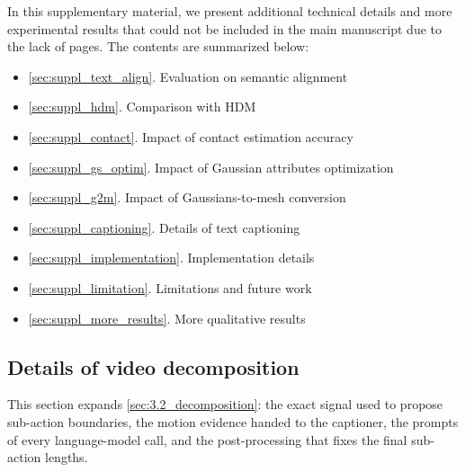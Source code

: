 \clearpage
\appendix

\setcounter{section}{0}
\setcounter{table}{0}
\setcounter{figure}{0}
\renewcommand{\thesection}{S\arabic{section}}   
\renewcommand{\thetable}{S\arabic{table}}   
\renewcommand{\thefigure}{S\arabic{figure}}

In this supplementary material, we present additional technical details and more experimental results that could not be included in the main manuscript due to the lack of pages.
The contents are summarized below:
\begin{itemize}
\vspace{2.5mm}
\item \ref{sec:suppl_text_align}. Evaluation on semantic alignment
\item \ref{sec:suppl_hdm}. Comparison with HDM
\item \ref{sec:suppl_contact}. Impact of contact estimation accuracy
\item \ref{sec:suppl_gs_optim}. Impact of Gaussian attributes optimization
\item \ref{sec:suppl_g2m}. Impact of Gaussians-to-mesh conversion
\item \ref{sec:suppl_captioning}. Details of text captioning
\item \ref{sec:suppl_implementation}. Implementation details
\item \ref{sec:suppl_limitation}. Limitations and future work
\item \ref{sec:suppl_more_results}. More qualitative results
\end{itemize}


\subsection{Details of video decomposition}
\label{sec:supp_decomposition}

This section expands \cref{sec:3.2_decomposition}: the exact signal used to
propose sub-action boundaries, the motion evidence handed to the captioner, the
prompts of every language-model call, and the post-processing that fixes the
final sub-action lengths.

